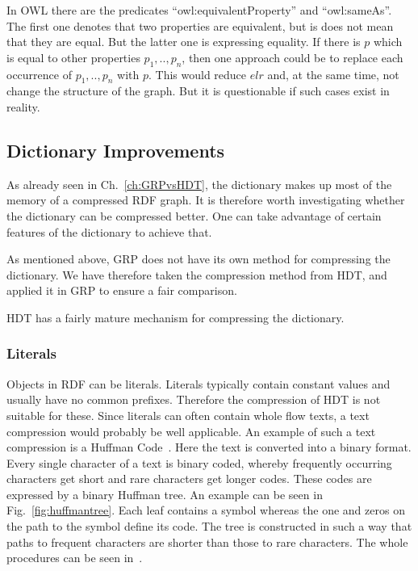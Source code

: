 In OWL there are the predicates \enquote{owl:equivalentProperty} and \enquote{owl:sameAs}. The first one denotes that two properties are equivalent, but is does not mean that they are equal. But the latter one is expressing equality. If there is $p$ which is equal to other properties $p_1,..,p_n$, then one approach could be to replace each occurrence of $p_1,..,p_n$ with $p$. This would reduce $elr$ and, at the same time, not change the structure of the graph. But it is questionable if such cases exist in reality.




\subsection{Dictionary Improvements}\label{sec:approachDictImprovements}


As already seen in Ch.~\ref{ch:GRPvsHDT}, the dictionary makes up most of the memory of a compressed RDF graph. It is therefore worth investigating whether the dictionary can be compressed better. One can take advantage of certain features of the dictionary to achieve that.

As mentioned above, GRP does not have its own method for compressing the dictionary. We have therefore taken the compression method from HDT, and applied it in GRP to ensure a fair comparison.

HDT has a fairly mature mechanism for compressing the dictionary.

\subsubsection{Literals}\label{sec:approachLiterals}

Objects in RDF can be literals. Literals typically contain constant values and usually have no common prefixes. Therefore the compression of HDT is not suitable for these. Since literals can often contain whole flow texts, a text compression would probably be well applicable. An example of such a text compression is a Huffman Code~\cite{huffman}. Here the text is converted into a binary format. Every single character of a text is binary coded, whereby frequently occurring characters get short and rare characters get longer codes. These codes are expressed by a binary Huffman tree. An example can be seen in Fig.~\ref{fig:huffmantree}. Each leaf contains a symbol whereas the one and zeros on the path to the symbol define its code. The tree is constructed in such a way that paths to frequent characters are shorter than those to rare characters. The whole procedures can be seen in~\cite{huffman}.


